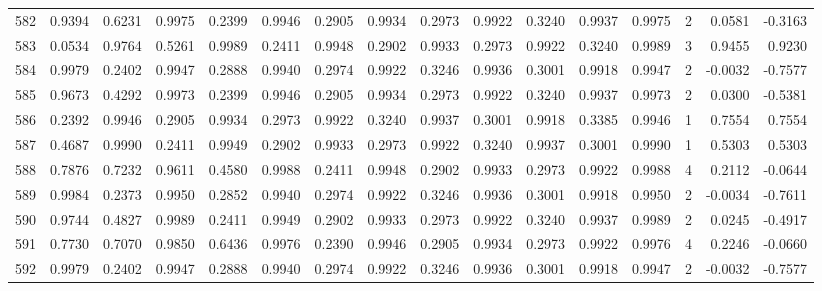 \begin{tabular}{lrrrrrrrrrrrrrrr}
582 &      0.9394 &  0.6231 &  0.9975 &  0.2399 &  0.9946 &  0.2905 &  0.9934 &  0.2973 &  0.9922 &  0.3240 &   0.9937 &     0.9975 &      2 &                    0.0581 &                    -0.3163 \\
583 &      0.0534 &  0.9764 &  0.5261 &  0.9989 &  0.2411 &  0.9948 &  0.2902 &  0.9933 &  0.2973 &  0.9922 &   0.3240 &     0.9989 &      3 &                    0.9455 &                     0.9230 \\
584 &      0.9979 &  0.2402 &  0.9947 &  0.2888 &  0.9940 &  0.2974 &  0.9922 &  0.3246 &  0.9936 &  0.3001 &   0.9918 &     0.9947 &      2 &                   -0.0032 &                    -0.7577 \\
585 &      0.9673 &  0.4292 &  0.9973 &  0.2399 &  0.9946 &  0.2905 &  0.9934 &  0.2973 &  0.9922 &  0.3240 &   0.9937 &     0.9973 &      2 &                    0.0300 &                    -0.5381 \\
586 &      0.2392 &  0.9946 &  0.2905 &  0.9934 &  0.2973 &  0.9922 &  0.3240 &  0.9937 &  0.3001 &  0.9918 &   0.3385 &     0.9946 &      1 &                    0.7554 &                     0.7554 \\
587 &      0.4687 &  0.9990 &  0.2411 &  0.9949 &  0.2902 &  0.9933 &  0.2973 &  0.9922 &  0.3240 &  0.9937 &   0.3001 &     0.9990 &      1 &                    0.5303 &                     0.5303 \\
588 &      0.7876 &  0.7232 &  0.9611 &  0.4580 &  0.9988 &  0.2411 &  0.9948 &  0.2902 &  0.9933 &  0.2973 &   0.9922 &     0.9988 &      4 &                    0.2112 &                    -0.0644 \\
589 &      0.9984 &  0.2373 &  0.9950 &  0.2852 &  0.9940 &  0.2974 &  0.9922 &  0.3246 &  0.9936 &  0.3001 &   0.9918 &     0.9950 &      2 &                   -0.0034 &                    -0.7611 \\
590 &      0.9744 &  0.4827 &  0.9989 &  0.2411 &  0.9949 &  0.2902 &  0.9933 &  0.2973 &  0.9922 &  0.3240 &   0.9937 &     0.9989 &      2 &                    0.0245 &                    -0.4917 \\
591 &      0.7730 &  0.7070 &  0.9850 &  0.6436 &  0.9976 &  0.2390 &  0.9946 &  0.2905 &  0.9934 &  0.2973 &   0.9922 &     0.9976 &      4 &                    0.2246 &                    -0.0660 \\
592 &      0.9979 &  0.2402 &  0.9947 &  0.2888 &  0.9940 &  0.2974 &  0.9922 &  0.3246 &  0.9936 &  0.3001 &   0.9918 &     0.9947 &      2 &                   -0.0032 &                    -0.7577 \\

\end{tabular}
